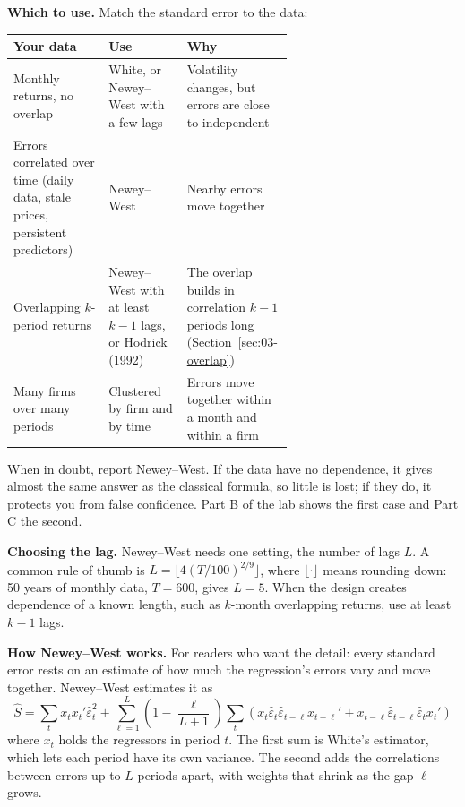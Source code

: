 \textbf{Which to use.} Match the standard error to the data:

\begin{center}
\small
\begin{tabularx}{0.95\linewidth}{@{}>{\raggedright\arraybackslash}p{0.34\linewidth}>{\raggedright\arraybackslash}p{0.28\linewidth}>{\raggedright\arraybackslash}X@{}}
\toprule
Your data & Use & Why \\
\midrule
Monthly returns, no overlap & White, or Newey--West with a few lags & Volatility changes, but errors are close to independent \\
Errors correlated over time (daily data, stale prices, persistent predictors) & Newey--West & Nearby errors move together \\
Overlapping $k$-period returns & Newey--West with at least $k-1$ lags, or Hodrick (1992) & The overlap builds in correlation $k-1$ periods long (Section~\ref{sec:03-overlap}) \\
Many firms over many periods & Clustered by firm and by time & Errors move together within a month and within a firm \\
\bottomrule
\end{tabularx}
\end{center}

When in doubt, report Newey--West. If the data have no dependence, it gives
almost the same answer as the classical formula, so little is lost; if they
do, it protects you from false confidence. Part B of the lab shows the first
case and Part C the second.

\textbf{Choosing the lag.} Newey--West needs one setting, the number of lags
$L$. A common rule of thumb is $L = \lfloor 4(T/100)^{2/9} \rfloor$, where
$\lfloor\cdot\rfloor$ means rounding down: 50 years of monthly data, $T = 600$,
gives $L = 5$. When the design creates dependence of a known length, such as
$k$-month overlapping returns, use at least $k - 1$ lags.

\textbf{How Newey--West works.} For readers who want the detail: every
standard error rests on an estimate of how much the regression's errors vary
and move together. Newey--West estimates it as
\begin{equation}
  \hat S = \sum_t x_t x_t' \hat\varepsilon_t^2 + \sum_{\ell=1}^{L} \left(1 - \frac{\ell}{L+1}\right) \sum_t \left(x_t \hat\varepsilon_t \hat\varepsilon_{t-\ell} x_{t-\ell}' + x_{t-\ell} \hat\varepsilon_{t-\ell} \hat\varepsilon_t x_t'\right)
  \label{eq:03-nw}
\end{equation}
where $x_t$ holds the regressors in period $t$. The first sum is White's
estimator, which lets each period have its own variance. The second adds the
correlations between errors up to $L$ periods apart, with weights that shrink
as the gap $\ell$ grows.

